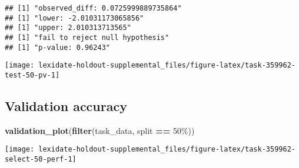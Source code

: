 \documentclass[
]{book}
\newenvironment{Shaded}{\begin{snugshade}}{\end{snugshade}}
\newcommand{\AttributeTok}[1]{\textcolor[rgb]{0.13,0.29,0.53}{#1}}
\newcommand{\DecValTok}[1]{\textcolor[rgb]{0.00,0.00,0.81}{#1}}
\newcommand{\FunctionTok}[1]{\textcolor[rgb]{0.13,0.29,0.53}{\textbf{#1}}}
\newcommand{\NormalTok}[1]{#1}
\newcommand{\OtherTok}[1]{\textcolor[rgb]{0.56,0.35,0.01}{#1}}
\newcommand{\SpecialCharTok}[1]{\textcolor[rgb]{0.81,0.36,0.00}{\textbf{#1}}}
\newcommand{\StringTok}[1]{\textcolor[rgb]{0.31,0.60,0.02}{#1}}
\begin{document}
\begin{Shaded}
\end{Shaded}

\begin{verbatim}
## [1] "observed_diff: 0.0725999889735864"
## [1] "lower: -2.01031173065856"
## [1] "upper: 2.010313713565"
## [1] "fail to reject null hypothesis"
## [1] "p-value: 0.96243"
\end{verbatim}

\texttt{[image: lexidate-holdout-supplemental\_files/figure-latex/task-359962-test-50-pv-1]}

\hypertarget{validation-accuracy-57}{%
\subsection{Validation accuracy}\label{validation-accuracy-57}}

\begin{Shaded}
\begin{Highlighting}[]
\FunctionTok{validation\_plot}\NormalTok{(}\FunctionTok{filter}\NormalTok{(task\_data, split }\SpecialCharTok{==} \StringTok{\textquotesingle{}50\%\textquotesingle{}}\NormalTok{))}
\end{Highlighting}
\end{Shaded}

\texttt{[image: lexidate-holdout-supplemental\_files/figure-latex/task-359962-select-50-perf-1]}
\end{document}
